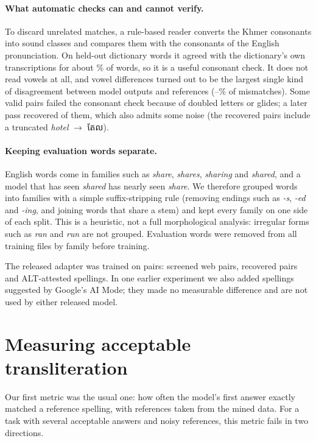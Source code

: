 \documentclass[10pt,a4paper,twocolumn]{article}
\newcommand{\km}[1]{{\khmerfont #1}}
\begin{document}
\paragraph{What automatic checks can and cannot verify.}
To discard unrelated matches, a rule-based reader converts the Khmer consonants into sound classes and compares
them with the consonants of the English pronunciation. On held-out dictionary words it agreed with the
dictionary's own transcriptions for about \% of words, so it is a useful consonant check. It does not
read vowels at all, and vowel differences turned out to be the largest single kind of disagreement between model
outputs and references (--\% of mismatches). Some valid pairs failed the consonant check
because of doubled letters or glides; a later pass recovered  of them, which also admits some
noise (the recovered pairs include a truncated \emph{hotel} $\rightarrow$ \km{តែល}).

\paragraph{Keeping evaluation words separate.}
English words come in families such as \emph{share}, \emph{shares}, \emph{sharing} and \emph{shared}, and a model that
has seen \emph{shared} has nearly seen \emph{share}. We therefore grouped words into families with a simple
suffix-stripping rule (removing endings such as \emph{-s}, \emph{-ed} and \emph{-ing}, and joining words that share
a stem) and kept every family on one side of each split. This is a heuristic, not a full morphological analysis:
irregular forms such as \emph{ran} and \emph{run} are not grouped. Evaluation words were removed from all training
files by family before training.

The released adapter was trained on  pairs: screened web pairs, recovered pairs and ALT-attested
spellings. In one earlier experiment we also added  spellings suggested by Google's AI Mode; they made no measurable difference and are not used by either released model.

\section{Measuring acceptable transliteration}
\label{sec:eval}

Our first metric was the usual one: how often the model's first answer exactly matched a reference spelling, with
references taken from the mined data. For a task with several acceptable answers and noisy references, this metric
fails in two directions.
\end{document}
